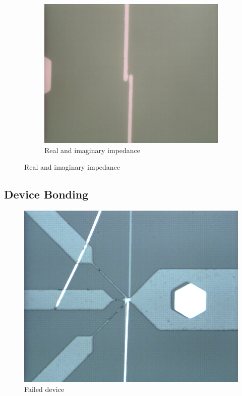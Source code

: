 \begin{figure}[h]
\begin{subfigure}[b]{0.45\textwidth}
        \includegraphics[width=\textwidth]{images/goodElectrodeCloseUp.png}
        \caption{Real and imaginary impedance}
    \end{subfigure}
\end{figure}


\FloatBarrier

\subsection{Device Bonding}


\begin{figure}[h]
    \centering
    \includegraphics[width=\textwidth]{images/bad_device.png}
    \caption{Failed device}
    \label{fig:bad_device}
\end{figure}


